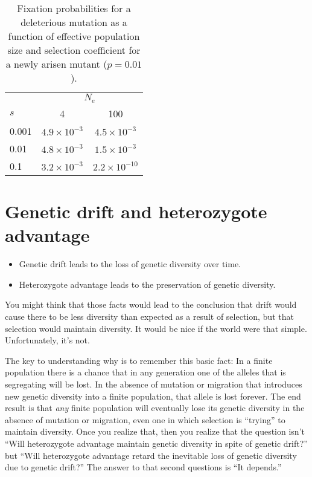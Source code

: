 \begin{table}
\begin{center}
\begin{tabular}{l|cc}
\hline\hline
      & \multicolumn{2}{c}{$N_e$} \\
$s$   & 4                  & 100 \\
\hline
0.001 & $4.9 \times 10^{-3}$ & $4.5 \times 10^{-3}$ \\
0.01  & $4.8 \times 10^{-3}$ & $1.5 \times 10^{-3}$ \\
0.1   & $3.2 \times 10^{-3}$ & $2.2 \times 10^{-10}$ \\
\hline
\end{tabular}
\end{center}
\caption{Fixation probabilities for a deleterious mutation as a
function of effective population size and selection coefficient for a
newly arisen mutant ($p=0.01$).}\label{table:fixation}
\end{table}

\section*{Genetic drift and heterozygote advantage}

\begin{itemize}

\item Genetic drift leads to the loss of genetic diversity over time. 

\item Heterozygote advantage leads to the preservation of genetic diversity.

\end{itemize}

You might think that those facts would lead to the conclusion that
drift would cause there to be less diversity than expected as a result
of selection, but that selection would maintain diversity. It would be
nice if the world were that simple. Unfortunately, it's not. 

The key to understanding why is to remember this basic fact: In a
finite population there is a chance that in any generation one of the
alleles that is segregating will be lost. In the absence of mutation
or migration that introduces new genetic diversity into a finite
population, that allele is lost forever. The end result is that {\it
  any\/} finite population will eventually lose its genetic diversity
in the absence of mutation or migration, even one in which selection
is ``trying'' to maintain diversity. Once you realize that, then you
realize that the question isn't ``Will heterozygote advantage maintain
genetic diversity in spite of genetic drift?'' but ``Will heterozygote
advantage retard the inevitable loss of genetic diversity due to
genetic drift?'' The answer to that second questions is ``It depends.''

